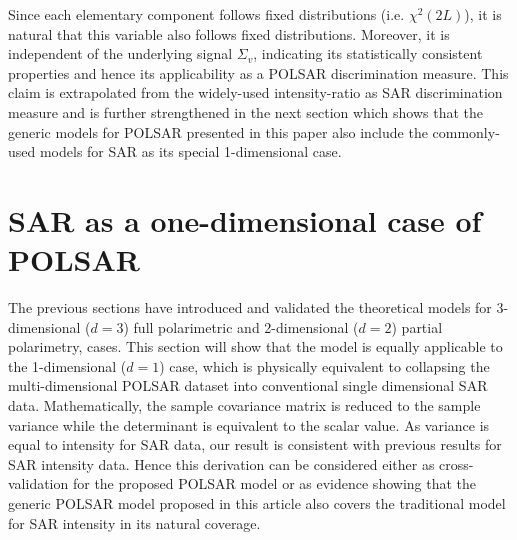 \documentclass[journal]{IEEEtran}
\begin{document}
Since each elementary component follows fixed distributions (i.e. $\chi^2(2L)$),
  it is natural that this variable also follows fixed distributions.
Moreover, it is independent of the underlying signal $\Sigma_v$,
  indicating its statistically consistent properties and hence its applicability as a POLSAR discrimination measure.
  This claim is extrapolated from the widely-used intensity-ratio as SAR discrimination measure and is further strengthened in the next section which shows that the generic models for POLSAR presented in this paper also include the commonly-used models for SAR as its special 1-dimensional case. 

\section{SAR as a one-dimensional case of POLSAR}
\label{sec:sar_special_case_of_polsar}

The previous sections have introduced and validated the theoretical models for 3-dimensional ($d=3$) full polarimetric and 2-dimensional ($d=2$) partial polarimetry, cases.
This section will show that the model is equally  applicable to the 1-dimensional ($d=1$) case,
  which is physically equivalent to  collapsing the multi-dimensional POLSAR dataset  into conventional single dimensional SAR data.
Mathematically, the sample covariance matrix is reduced to the sample variance while the determinant is equivalent to  the scalar value.
As variance is equal to intensity for SAR data, our result is consistent with previous results for SAR intensity data.
Hence this derivation can be considered
  either as cross-validation for the proposed POLSAR model
  or as evidence showing that
    the generic POLSAR model proposed in this article also covers the traditional model for SAR intensity in its natural coverage.
  
\end{document}
